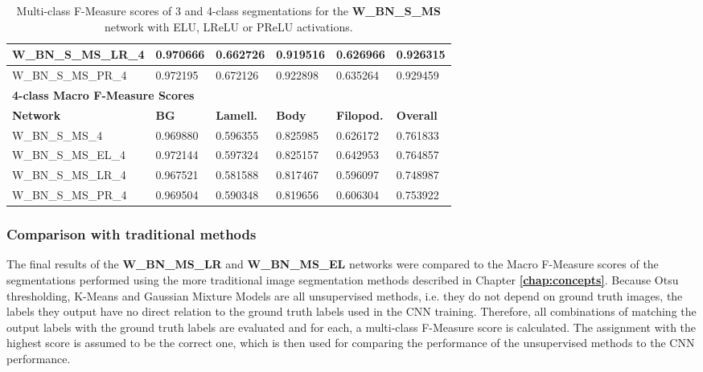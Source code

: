 \begin {table}
\begin{flushleft}
\begin {tabular}[!htb]{|l|l|l|l|l|l|}
			W\_BN\_S\_MS\_LR\_4& 0.970666& 0.662726& 0.919516& 0.626966& 0.926315 \\ \hline
			W\_BN\_S\_MS\_PR\_4& 0.972195& 0.672126& 0.922898& 0.635264& 0.929459 \\ \hline
			\multicolumn{6}{|l|}{\textbf{4-class Macro F-Measure Scores}} \\ \hline
			\textbf{Network}& \textbf{BG}& \textbf{Lamell.}& \textbf{Body}& \textbf{Filopod.}& \textbf{Overall} \\ \hline
			W\_BN\_S\_MS\_4& 0.969880& 0.596355& \cellcolor{green!25}0.825985& 0.626172& 0.761833 \\ \hline
			W\_BN\_S\_MS\_EL\_4& \cellcolor{green!25}0.972144& \cellcolor{green!25}0.597324& 0.825157& \cellcolor{green!25}0.642953& \cellcolor{green!25}0.764857 \\ \hline
			W\_BN\_S\_MS\_LR\_4& 0.967521& 0.581588& 0.817467& 0.596097& 0.748987 \\ \hline
			W\_BN\_S\_MS\_PR\_4& 0.969504& 0.590348& 0.819656& 0.606304& 0.753922 \\ \hline
		\end {tabular}
	\end {flushleft}
\caption[Multi-class F-Measure scores for networks with different activation functions.]{Multi-class F-Measure scores of 3 and 4-class segmentations for the \textbf{W\_BN\_S\_MS} network with ELU, LReLU or PReLU activations.}
\label{tab:results5}
\end {table}

	
	\subsubsection{Comparison with traditional methods}

\noindent The final results of the \textbf{W\_BN\_MS\_LR} and \textbf{W\_BN\_MS\_EL} networks were compared to the Macro F-Measure scores of the segmentations performed using the more traditional image segmentation methods described in Chapter \textbf{\ref{chap:concepts}}. Because Otsu thresholding, K-Means and Gaussian Mixture Models are all unsupervised methods, i.e. they do not depend on ground truth images, the labels they output have no direct relation to the ground truth labels used in the CNN training. Therefore, all combinations of matching the output labels with the ground truth labels are evaluated and for each, a multi-class F-Measure score is calculated. The assignment with the highest score is assumed to be the correct one, which is then used for comparing the performance of the unsupervised methods to the CNN performance.\\


